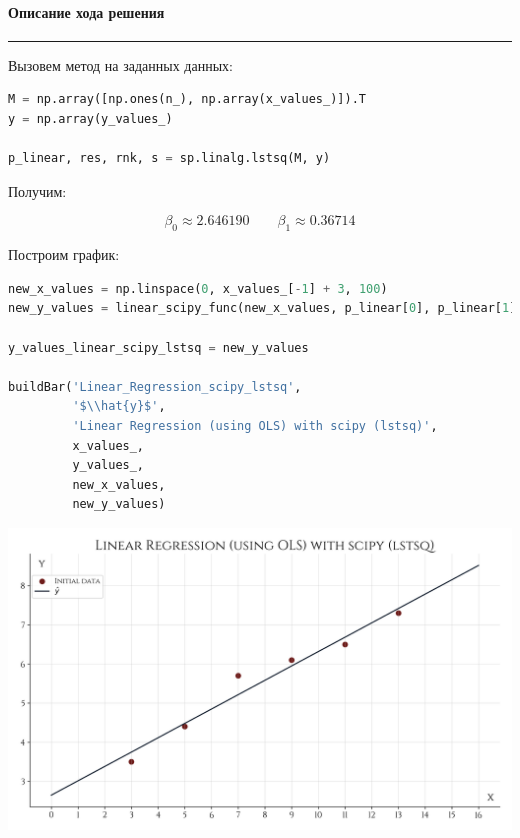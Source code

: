 \documentclass[a4paper, 14pt]{extarticle}
\begin{document}
\paragraph*{{Описание хода решения}}\vspace{-20pt}\rule{\linewidth}{0.1mm}

Вызовем метод на заданных данных:

\begin{center}
    \begin{lstlisting}[language=Python]
M = np.array([np.ones(n_), np.array(x_values_)]).T
y = np.array(y_values_)

p_linear, res, rnk, s = sp.linalg.lstsq(M, y)
    \end{lstlisting}
\end{center}

Получим:

\begin{equation*}
    \beta_0 \approx 2.646190 \qquad \beta_1 \approx 0.36714
\end{equation*}

Построим график:

\begin{center}
    \begin{lstlisting}[language=Python]
new_x_values = np.linspace(0, x_values_[-1] + 3, 100)
new_y_values = linear_scipy_func(new_x_values, p_linear[0], p_linear[1])

y_values_linear_scipy_lstsq = new_y_values

buildBar('Linear_Regression_scipy_lstsq', 
         '$\\hat{y}$', 
         'Linear Regression (using OLS) with scipy (lstsq)', 
         x_values_, 
         y_values_, 
         new_x_values, 
         new_y_values)
    \end{lstlisting}
\end{center}

\begin{center}
    \includegraphics[width=1\textwidth, height=1\textheight, keepaspectratio]{Linear_Regression_scipy_lstsq} \\
\end{center}
\end{document}
